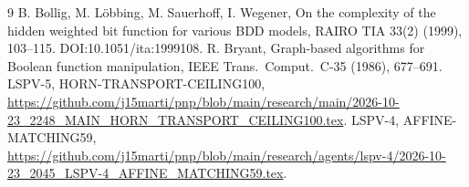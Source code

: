 \documentclass[11pt]{article}
\begin{document}
\begin{thebibliography}{9}
 B. Bollig, M. L\"obbing, M. Sauerhoff, I. Wegener, On the complexity of the hidden weighted bit function for various BDD models, RAIRO TIA 33(2) (1999), 103--115. DOI:10.1051/ita:1999108.
 R. Bryant, Graph-based algorithms for Boolean function manipulation, IEEE Trans.\ Comput.\ C-35 (1986), 677--691.
 LSPV-5, HORN-TRANSPORT-CEILING100, \url{https://github.com/j15marti/pnp/blob/main/research/main/2026-10-23_2248_MAIN_HORN_TRANSPORT_CEILING100.tex}.
 LSPV-4, AFFINE-MATCHING59, \url{https://github.com/j15marti/pnp/blob/main/research/agents/lspv-4/2026-10-23_2045_LSPV-4_AFFINE_MATCHING59.tex}.
\end{thebibliography}
\end{document}
